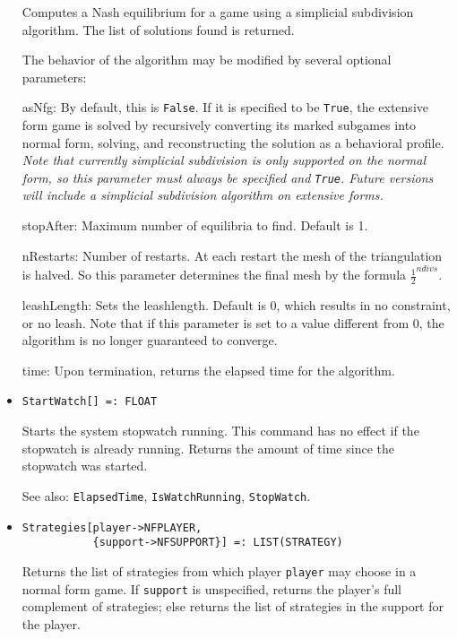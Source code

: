 \begin{itemize}
\bd
Computes a Nash equilibrium for a game using a simplicial subdivision
algorithm.  The list of solutions found is returned.

The behavior of the algorithm may be modified by several optional
parameters:

\bd
\item
[asNfg:] By default, this is \verb+False+.  If it is specified to be
\verb+True+, the extensive form game is solved by recursively converting
its marked subgames into normal form, solving, and reconstructing the
solution as a behavioral profile.  {\it Note that currently simplicial
subdivision is only supported on the normal form, so this parameter
must always be specified and {\tt True}.  Future versions will include
a simplicial subdivision algorithm on extensive forms.}
\item
[stopAfter:] Maximum number of equilibria to find. Default is 1.  
\item 
[nRestarts:] Number of restarts.  At each restart the mesh of the
triangulation is halved.  So this parameter determines the final mesh
by the formula $\frac{1}{2}^{ndivs}$.
\item
[leashLength:] Sets the leashlength. Default is 0, which results in no
constraint, or no leash.  Note that if this parameter is set to a value
different from 0, the algorithm is no longer guaranteed to converge.
\item
[time:] Upon termination, returns the elapsed time for the algorithm.
\ed
\ed

\item
\protect \large \begin{verbatim}
StartWatch[] =: FLOAT
\end{verbatim}\normalsize

\bd Starts the system stopwatch running.  This command has no
effect if the stopwatch is already running.
Returns the amount of time since the stopwatch was started.
\item
[See also:] {\tt ElapsedTime}, {\tt IsWatchRunning}, {\tt StopWatch}.
\ed

\item
\protect \large \begin{verbatim}
Strategies[player->NFPLAYER, 
           {support->NFSUPPORT}] =: LIST(STRATEGY)
\end{verbatim}\normalsize

\bd
Returns the list of strategies from which player \verb+player+ may choose
in a normal form game.  If \verb+support+ is unspecified, returns the
player's full complement of strategies; else returns the list of strategies
in the support for the player.
\ed


\end{itemize}
